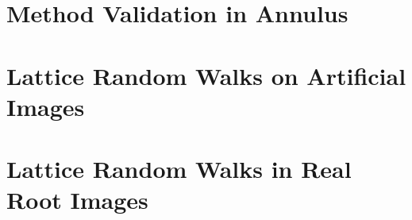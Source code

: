 \documentclass{uofsthesis-cs}
\begin{document}
\chapter{Method Validation in Annulus}

  

  

  

  


  
\chapter{Lattice Random Walks on Artificial Images}

  

  

  


\chapter{Lattice Random Walks in Real Root Images}
  

  

  
\end{document}
